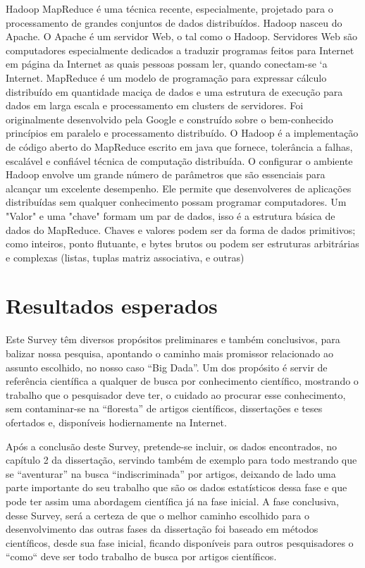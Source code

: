 \documentclass[conference,compsoc]{IEEEtran}
\begin{document}
Hadoop MapReduce é uma técnica recente, especialmente, projetado para o processamento de grandes conjuntos de dados distribuídos. Hadoop nasceu do Apache. O Apache é um servidor Web, o tal como o Hadoop. Servidores Web são computadores especialmente dedicados a traduzir programas feitos para Internet em página da Internet as quais pessoas possam ler, quando conectam-se `a Internet. MapReduce é um modelo de programação para expressar cálculo distribuído em quantidade maciça de
dados e uma estrutura de execução para dados em larga escala e processamento em clusters de servidores. Foi originalmente desenvolvido pela Google e construído sobre o bem-conhecido
princípios em paralelo e processamento distribuído.
O Hadoop é a implementação de código aberto do MapReduce escrito em java que fornece, tolerância a falhas, escalável e confiável técnica de computação distribuída.
O configurar o ambiente Hadoop envolve um grande número de parâmetros que são essenciais para alcançar um excelente desempenho. Ele permite que desenvolveres de aplicações distribuídas sem qualquer conhecimento possam programar computadores. 
Um "Valor" e uma "chave" formam um par de dados, isso é a estrutura básica de dados do MapReduce. 
Chaves e valores podem ser da forma de dados primitivos; como inteiros, ponto flutuante,  e bytes brutos ou podem ser estruturas arbitrárias e complexas (listas, tuplas matriz associativa, e outras)

\section{Resultados esperados}

Este Survey têm diversos propósitos preliminares e também conclusivos, para balizar nossa pesquisa, apontando o caminho
mais promissor relacionado ao assunto escolhido, no nosso caso “Big Dada”. Um dos propósito é servir de referência científica
a qualquer de busca por conhecimento científico, mostrando o trabalho que o pesquisador deve ter, o cuidado ao procurar 
esse conhecimento, sem contaminar-se na “floresta” de artigos científicos, dissertações e teses ofertados e, disponíveis
hodiernamente na Internet. 

Após a conclusão deste Survey, pretende-se incluir, os dados encontrados, no capítulo 2 da dissertação, servindo também 
de exemplo para todo mestrando que se “aventurar” na busca “indiscriminada” por artigos, deixando de lado uma parte 
importante do seu trabalho que são os dados estatísticos dessa fase e que pode ter assim uma abordagem científica já na 
fase inicial.
A fase conclusiva, desse Survey, será a certeza de que o melhor caminho escolhido para o desenvolvimento das outras
fases da dissertação foi baseado em métodos científicos, desde sua fase inicial, ficando disponíveis para outros pesquisadores 
o ``como`` deve ser todo trabalho de busca por artigos científicos.
\end{document}
